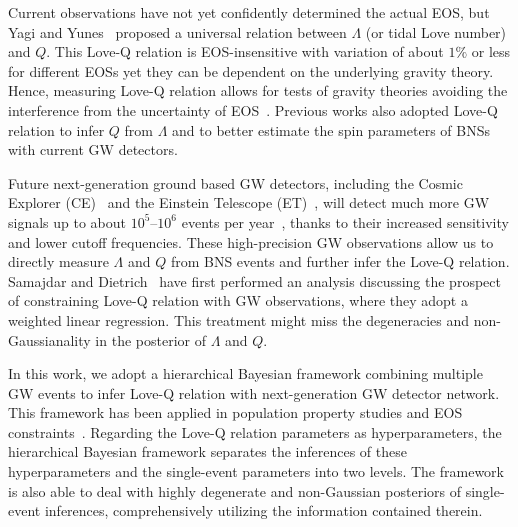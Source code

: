 \documentclass[a4paper,11pt]{article}
\begin{document}
Current observations have not yet confidently determined the actual EOS, but Yagi and Yunes~\cite{Yagi:2013bca,Yagi:2013awa} proposed a universal relation between $\Lambda$ (or tidal Love number) and $Q$. This Love-Q relation is EOS-insensitive with variation of about $1\%$ or less for different EOSs yet they can be dependent on the underlying gravity theory. Hence, measuring Love-Q relation allows for tests of gravity theories avoiding the interference from the uncertainty of EOS~\cite{Yagi:2013bca,Silva:2020acr,Shao:2022koz}. Previous works also adopted Love-Q relation to infer $Q$ from $\Lambda$ and to better estimate the spin parameters of BNSs~\cite{Yagi:2013bca,LIGOScientific:2018cki,LIGOScientific:2018hze,LIGOScientific:2020aai} with current GW detectors. 

Future next-generation ground based GW detectors, including the Cosmic Explorer (CE)~\cite{Reitze:2019iox,Reitze:2019dyk} and the Einstein Telescope (ET)~\cite{Punturo:2010zz,Hild:2010id,Sathyaprakash:2012jk}, will detect much more GW signals up to about $10^5$--$10^6$ events per year~\cite{LIGOScientific:2017zlf,Sathyaprakash:2019yqt,Kalogera:2021bya,Samajdar:2021egv}, thanks to their increased sensitivity and lower cutoff frequencies. These high-precision GW observations allow us to directly measure $\Lambda$ and $Q$ from BNS events and further infer the Love-Q relation. Samajdar and Dietrich~\cite{Samajdar:2020xrd} have first performed an analysis discussing the prospect of constraining Love-Q relation with GW observations, where they adopt a weighted linear regression. This treatment might miss the degeneracies and non-Gaussianality in the posterior of $\Lambda$ and $Q$. 

In this work, we adopt a hierarchical Bayesian framework combining multiple GW events to infer Love-Q relation with next-generation GW detector network. This framework has been applied in population property studies and EOS constraints~\cite{Mandel:2009nx,Mandel:2009pc,Adams:2012qw,Lackey:2014fwa,Mandel:2018mve,Thrane_2019,KAGRA:2021duu,Wang:2024xon}. Regarding the Love-Q relation parameters as hyperparameters, the hierarchical Bayesian framework separates the inferences of these hyperparameters and the single-event parameters into two levels. The framework is also able to deal with highly degenerate and non-Gaussian posteriors of single-event inferences, comprehensively utilizing the information contained therein. 
\end{document}
